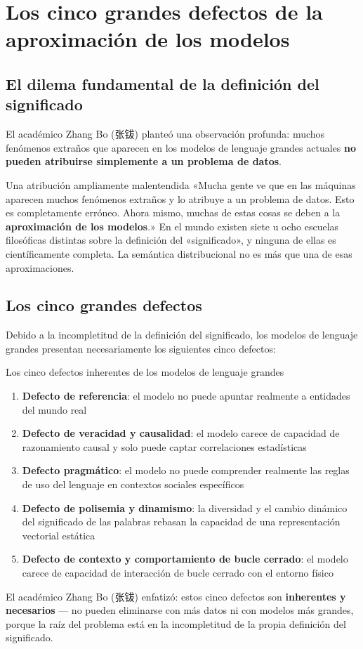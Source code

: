 \section{Los cinco grandes defectos de la aproximación de los modelos}

\subsection{El dilema fundamental de la definición del significado}

El académico Zhang Bo (张钹) planteó una observación profunda: muchos fenómenos extraños que aparecen en los modelos de lenguaje grandes actuales \textbf{no pueden atribuirse simplemente a un problema de datos}.

\begin{warningbox}{Una atribución ampliamente malentendida}
«Mucha gente ve que en las máquinas aparecen muchos fenómenos extraños y lo atribuye a un problema de datos. Esto es completamente erróneo. Ahora mismo, muchas de estas cosas se deben a la \textbf{aproximación de los modelos}.» En el mundo existen siete u ocho escuelas filosóficas distintas sobre la definición del «significado», y ninguna de ellas es científicamente completa. La semántica distribucional no es más que una de esas aproximaciones.
\end{warningbox}

\subsection{Los cinco grandes defectos}

Debido a la incompletitud de la definición del significado, los modelos de lenguaje grandes presentan necesariamente los siguientes cinco defectos:

\begin{importantbox}{Los cinco defectos inherentes de los modelos de lenguaje grandes}
\begin{enumerate}
\item \textbf{Defecto de referencia}: el modelo no puede apuntar realmente a entidades del mundo real
\item \textbf{Defecto de veracidad y causalidad}: el modelo carece de capacidad de razonamiento causal y solo puede captar correlaciones estadísticas
\item \textbf{Defecto pragmático}: el modelo no puede comprender realmente las reglas de uso del lenguaje en contextos sociales específicos
\item \textbf{Defecto de polisemia y dinamismo}: la diversidad y el cambio dinámico del significado de las palabras rebasan la capacidad de una representación vectorial estática
\item \textbf{Defecto de contexto y comportamiento de bucle cerrado}: el modelo carece de capacidad de interacción de bucle cerrado con el entorno físico
\end{enumerate}
\end{importantbox}

El académico Zhang Bo (张钹) enfatizó: estos cinco defectos son \textbf{inherentes y necesarios} — no pueden eliminarse con más datos ni con modelos más grandes, porque la raíz del problema está en la incompletitud de la propia definición del significado.

